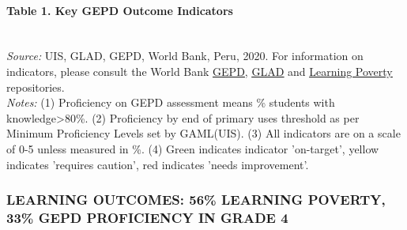 \documentclass[
  twocolumn]{article}
\begin{document}
\hypertarget{table-1.-key-gepd-outcome-indicators}{%
\paragraph{Table 1. Key GEPD Outcome
Indicators}\label{table-1.-key-gepd-outcome-indicators}}

\begin{table}[H]
\\
\color{darkgray}\scriptsize{\textit{Source:} UIS, GLAD, GEPD, World Bank, Peru, 2020. For information on indicators, please consult the World Bank \href{https://github.com/worldbank/GEPD}{\underline{GEPD}}, \href{https://github.com/worldbank/GLAD}{\underline{GLAD}} and \href{https://github.com/worldbank/LearningPoverty}{\underline{Learning Poverty}} repositories.}\\
\color{darkgray}\scriptsize{\textit{Notes:} (1) Proficiency on GEPD assessment means \% students with knowledge\textgreater{80\%}. (2) Proficiency by end of primary uses threshold as per Minimum Proficiency Levels set by GAML(UIS). (3) All indicators are on a scale of 0-5 unless measured in \%. (4) Green indicates indicator 'on-target', yellow indicates 'requires caution', red indicates 'needs improvement'.}
\end{table}
\raggedbottom

\hypertarget{learning-outcomes-56-learning-poverty-33-gepd-proficiency-in-grade-4}{%
\subsubsection{\texorpdfstring{\textbf{LEARNING OUTCOMES: 56\% LEARNING
POVERTY, 33\% GEPD PROFICIENCY IN GRADE
4}}{LEARNING OUTCOMES: 56\% LEARNING POVERTY, 33\% GEPD PROFICIENCY IN GRADE 4}}\label{learning-outcomes-56-learning-poverty-33-gepd-proficiency-in-grade-4}}
\end{document}
